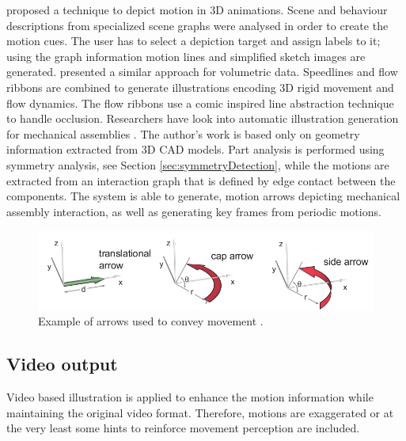 \cite{Nienhaus2005} proposed a technique to depict motion in 3D animations.
Scene and behaviour descriptions from specialized scene graphs were analysed in order to create the motion cues.
The user has to select a depiction target and assign labels to it; using the graph information motion lines and simplified sketch images are generated.
\cite{Joshi2005} presented a similar approach for volumetric data.
Speedlines and flow ribbons are combined to generate illustrations encoding 3D rigid movement and flow dynamics.
The flow ribbons use a comic inspired line abstraction technique to handle occlusion.
Researchers have look into automatic illustration generation for mechanical assemblies \cite{Mitra2010}.
The author's work is based only on geometry information extracted from 3D CAD models.
Part analysis is performed using symmetry analysis, see Section \ref{sec:symmetryDetection}, while the motions are extracted from an interaction graph that is defined by edge contact between the components.
The system is able to generate, motion arrows depicting mechanical assembly interaction, as well as generating key frames from periodic motions.

\begin{figure}[htbp]
	\centering
	\includegraphics[scale=.5]{images/arrow_types2}
	\caption{Example of arrows used to convey movement \cite{Mitra2010}.}
	\label{fig:arrowTypes}
\end{figure}

\subsection{Video output}

Video based illustration is applied to enhance the motion information while maintaining the original video format.
Therefore, motions are exaggerated or at the very least some hints to reinforce movement perception are included.

